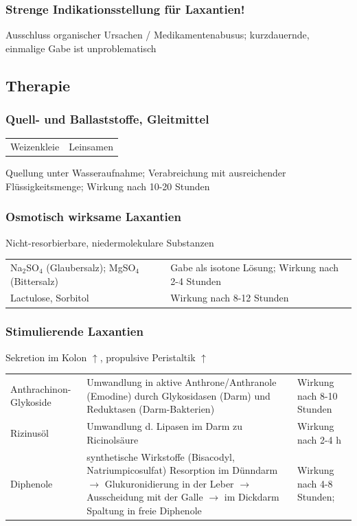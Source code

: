 \documentclass[10pt,a4paper]{report}
\begin{document}
\subsubsection{Strenge Indikationsstellung für Laxantien!} %
\label{ssub:strenge_indikationsstellung_f_r_laxantien_}
Ausschluss organischer Ursachen / Medikamentenabusus; kurzdauernde, einmalige Gabe ist unproblematisch
\subsection{Therapie} %
\label{sub:therapie}
\subsubsection{Quell- und Ballaststoffe, Gleitmittel} %
\label{ssub:quell_und_ballaststoffe_gleitmittel}
\begin{tabularx}{\textwidth}{XX}
Weizenkleie&Leinsamen\\
\end{tabularx}
Quellung unter Wasseraufnahme; Verabreichung mit ausreichender Flüssigkeitsmenge; Wirkung nach 10-20 Stunden
\subsubsection{Osmotisch wirksame Laxantien} %
\label{ssub:osmotisch_wirksame_laxantien}
Nicht-resorbierbare, niedermolekulare Substanzen\\
\begin{tabularx}{\textwidth}{lX}
Na$_2$SO$_4$ (Glaubersalz); MgSO$_4$ (Bittersalz)&Gabe als isotone Lösung; Wirkung nach 2-4 Stunden\\
Lactulose, Sorbitol&Wirkung nach 8-12 Stunden\\
\end{tabularx}
\subsubsection{Stimulierende Laxantien} %
\label{ssub:stimulierende_laxantien}
Sekretion im Kolon $\uparrow$, propulsive Peristaltik $\uparrow$
\begin{tabularx}{\textwidth}{lXX}
Anthrachinon-Glykoside&Umwandlung in aktive Anthrone/Anthranole (Emodine) durch Glykosidasen (Darm) und Reduktasen (Darm-Bakterien)& Wirkung nach 8-10 Stunden\\
Rizinusöl&Umwandlung d. Lipasen im Darm zu Ricinolsäure&Wirkung nach 2-4 h\\
Diphenole&synthetische Wirkstoffe (Bisacodyl, Natriumpicosulfat) Resorption im Dünndarm $\rightarrow$ Glukuronidierung in der Leber $\rightarrow$ Ausscheidung mit der Galle $\rightarrow$ im Dickdarm Spaltung in freie Diphenole& Wirkung nach 4-8 Stunden; 
\end{tabularx}
\end{document}
